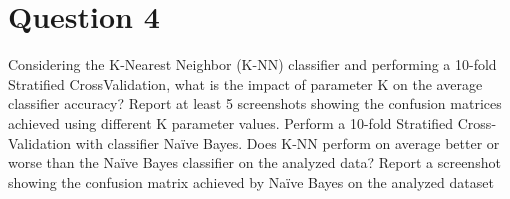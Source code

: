 \section{Question 4}

\begin{question}
    Considering the K-Nearest Neighbor (K-NN) classifier and performing a 10-fold Stratified
    CrossValidation, what is the impact of parameter K on the average classifier accuracy? Report at
    least 5 screenshots showing the confusion matrices achieved using different K parameter values.
    Perform a 10-fold Stratified Cross-Validation with classifier Naïve Bayes. Does K-NN perform on
    average better or worse than the Naïve Bayes classifier on the analyzed data? Report a screenshot
    showing the confusion matrix achieved by Naïve Bayes on the analyzed dataset
\end{question}

\begin{answer}
\end{answer}
